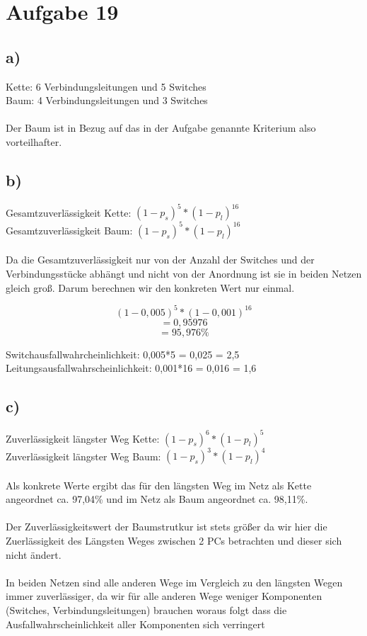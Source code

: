\documentclass[a4paper,12pt]{scrartcl}
\begin{document}
\section{Aufgabe 19}

\subsection{a)}
Kette: 6 Verbindungsleitungen und 5 Switches \\
Baum: 4 Verbindungsleitungen und 3 Switches 
\\
\\
Der Baum ist in Bezug auf das in der Aufgabe genannte Kriterium also vorteilhafter.

\subsection{b)}
Gesamtzuverlässigkeit Kette: $(1 - p_s)^5 * (1 - p_l)^{16}$ \\
Gesamtzuverlässigkeit Baum: $(1 - p_s)^5 * (1-p_l)^{16}$
\\
\\
Da die Gesamtzuverlässigkeit nur von der Anzahl der Switches und der Verbindungsstücke abhängt und nicht von der Anordnung ist sie in beiden Netzen gleich groß.
Darum berechnen wir den konkreten Wert nur einmal.

\[(1 - 0,005)^5 * (1 - 0,001)^{16}\]
\[= 0,95976\]
\[= 95,976 \%\]

Switchausfallwahrcheinlichkeit: 0,005*5 = 0,025 = 2,5 %
\\Leitungsausfallwahrscheinlichkeit: 0,001*16 = 0,016 = 1,6 %

\subsection{c)}
Zuverlässigkeit längster Weg Kette: $(1 - p_s)^6 * (1 - p_l)^5$ \\
Zuverlässigkeit längster Weg Baum: $(1 - p_s)^3 * (1 - p_l)^4$ 
\\
\\
Als konkrete Werte ergibt das für den längsten Weg im Netz als Kette angeordnet ca. 97,04\%
und im Netz als Baum angeordnet ca. 98,11\%. \\
\\
Der Zuverlässigkeitswert der Baumstrutkur ist stets größer da wir hier die Zuerlässigkeit des Längsten Weges zwischen 2 PCs betrachten und dieser sich nicht ändert.
\\
\\
In beiden Netzen sind alle anderen Wege im Vergleich zu den längsten Wegen immer zuverlässiger, da wir für alle anderen Wege weniger Komponenten (Switches, Verbindungsleitungen) brauchen woraus folgt dass die Ausfallwahrscheinlichkeit aller Komponenten sich verringert
\end{document}
